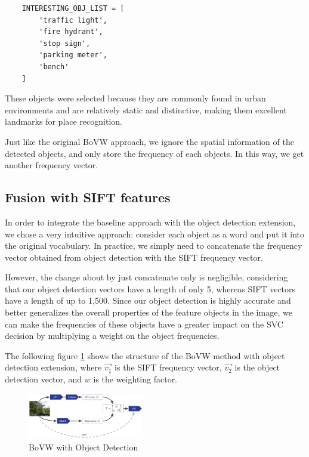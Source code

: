 \documentclass[conference]{IEEEtran}
\begin{document}
\begin{verbatim}
    INTERESTING_OBJ_LIST = [
        'traffic light',
        'fire hydrant',
        'stop sign',
        'parking meter',
        'bench'
    ]
\end{verbatim}

These objects were selected because they are commonly found in urban environments and are relatively static and distinctive, making them excellent landmarks for place recognition.

Just like the original BoVW approach, we ignore the spatial information of the detected objects, and only store the frequency of each objects. In this way, we get another frequency vector.

\subsection{Fusion with SIFT features}

In order to integrate the baseline approach with the object detection extension, we chose a very intuitive approach: consider each object as a word and put it into the original vocabulary. In practice, we simply need to concatenate the frequency vector obtained from object detection with the SIFT frequency vector.

However, the change about by just concatenate only is negligible, considering that our object detection vectors have a length of only 5, whereas SIFT vectors have a length of up to 1,500. Since our object detection is highly accurate and better generalizes the overall properties of the feature objects in the image, we can make the frequencies of these objects have a greater impact on the SVC decision by multiplying a weight on the object frequencies.

The following figure \ref{fig:1} shows the structure of the BoVW method with object detection extension, where $\overrightarrow{v_1}$ is the SIFT frequency vector, $\overrightarrow{v_2}$ is the object detection vector, and $w$ is the weighting factor.

\begin{figure}[H]
    \centering
    \includegraphics[width=0.45\textwidth]{fig_1.png}
    \caption{BoVW with Object Detection}
    \label{fig:1}
\end{figure}
\end{document}

